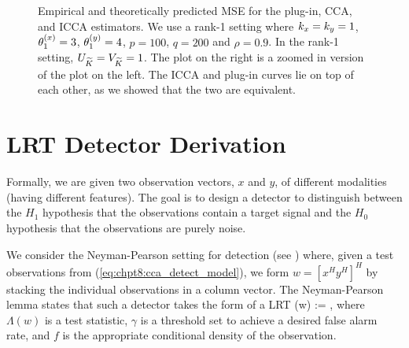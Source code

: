 \begin{figure} 
  \caption{Empirical and theoretically predicted MSE for the plug-in, CCA, and ICCA
    estimators. We use a rank-1 setting where $k_x=k_y=1$, $\theta^{(x)}_1=3$, $\theta^{(y)}_1=4$,
    $p=100$, $q=200$ and $\rho=0.9$. In the rank-1 setting, $U_{\widetilde{K}}=V_{\widetilde{K}}=1$. The plot on
    the right is a zoomed in version of the plot on the left. The ICCA and plug-in curves
    lie on top of each other, as we showed that the two are equivalent.}
  \label{fig:chpt8:mse}
\end{figure}



\section{LRT Detector Derivation}

Formally, we are given two observation vectors, $x$ and $y$, of different modalities
(having different features). The goal is to design a detector to distinguish between the
$H_1$ hypothesis that the observations contain a target signal and the $H_0$ hypothesis
that the observations are purely noise. 

We consider the Neyman-Pearson setting for detection (see \cite{van1968detection}) where, given a
test observations from (\ref{eq:chpt8:cca_detect_model}), we form $w=[x^H y^H]^H$ by stacking the
individual observations in a column vector. The Neyman-Pearson lemma states that such a
detector takes the form of a LRT
\beq\label{eq:chpt8:lrt}
\Lambda(w) := \detgtrless \gamma,
\eeq
where $\Lambda(w)$ is a test statistic, $\gamma$ is a threshold set to achieve a desired
false alarm rate, and $f$ is the appropriate conditional density of the observation.


